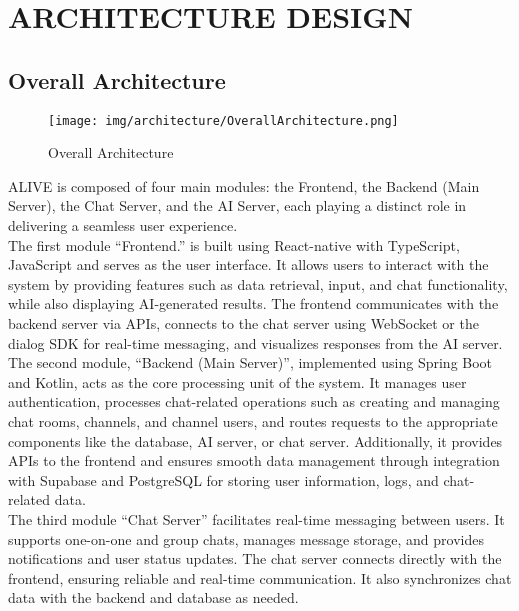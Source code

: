 \documentclass[conference]{IEEEtran}
\begin{document}
\section{ARCHITECTURE DESIGN}
\subsection{Overall Architecture}

\begin{figure}[h]
\centering   
\texttt{[image: img/architecture/OverallArchitecture.png]}
\caption{Overall Architecture}
\end{figure}

\hspace{0.7em} ALIVE is composed of four main modules: the Frontend, the Backend (Main Server), the Chat Server, and the AI Server, each playing a distinct role in delivering a seamless user experience. \\

\hspace{0.7em} The first module “Frontend.”  is built using React-native with TypeScript, JavaScript and serves as the user interface. It allows users to interact with the system by providing features such as data retrieval, input, and chat functionality, while also displaying AI-generated results. The frontend communicates with the backend server via APIs, connects to the chat server using WebSocket or the dialog SDK for real-time messaging, and visualizes responses from the AI server. \\


\hspace{0.7em} The second module, “Backend (Main Server)”, implemented using Spring Boot and Kotlin, acts as the core processing unit of the system. It manages user authentication, processes chat-related operations such as creating and managing chat rooms, channels, and channel users, and routes requests to the appropriate components like the database, AI server, or chat server. Additionally, it provides APIs to the frontend and ensures smooth data management through integration with Supabase and PostgreSQL for storing user information, logs, and chat-related data. \\

\hspace{0.7em} The third module “Chat Server” facilitates real-time messaging between users. It supports one-on-one and group chats, manages message storage, and provides notifications and user status updates. The chat server connects directly with the frontend, ensuring reliable and real-time communication. It also synchronizes chat data with the backend and database as needed. \\ 
\end{document}
